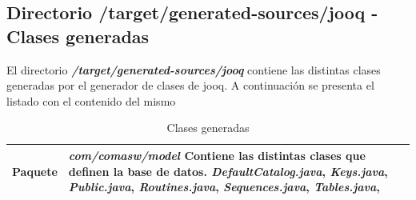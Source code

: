 \subsection{Directorio /target/generated-sources/jooq - Clases generadas}
\label{sub:clases-generadas}
El directorio \textit{\textbf{/target/generated-sources/jooq}} contiene las distintas clases generadas por el generador de clases de \acrshort{jooq}. A continuación se presenta el listado con el contenido del mismo



\begin{longtable}{m{3cm} m{12cm}}
    \caption{Clases generadas}
    \label{tab:generados}\\  	
    \rowcolors{2}{white}{white}
\textbf{Paquete} & \textit{\textbf{com/comasw/model}} \newline
	Contiene las distintas clases que definen la base de datos.\newline    
\textit{DefaultCatalog.java}, 
\textit{Keys.java}, 
\textit{Public.java}, 
\textit{Routines.java}, 
\textit{Sequences.java}, 
\textit{Tables.java},
\\\hline


\end{longtable}
